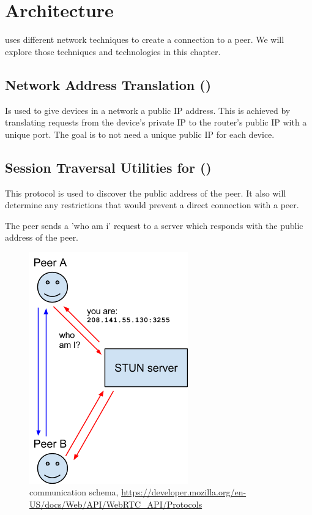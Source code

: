 \section{Architecture}
 uses different network techniques to create a connection to a peer. We will explore those techniques and technologies in this chapter.

\subsection{Network Address Translation ()}
Is used to give devices in a network a public IP address. This is achieved by translating requests from the device's private IP to the router's public IP with a unique port. The goal is to not need a unique public IP for each device.

\subsection{Session Traversal Utilities for  ()}
This protocol is used to discover the public address of the peer. It also will determine any restrictions that would prevent a direct connection with a peer.

The peer sends a 'who am i' request to a  server which responds with the public address of the peer.

\begin{figure}[H]
	\includegraphics[scale=0.5]{images/webrtc-stun.png}
	\centering
	\caption{ communication schema, \url{https://developer.mozilla.org/en-US/docs/Web/API/WebRTC_API/Protocols}}
	\label{fig:STUN}
\end{figure}

